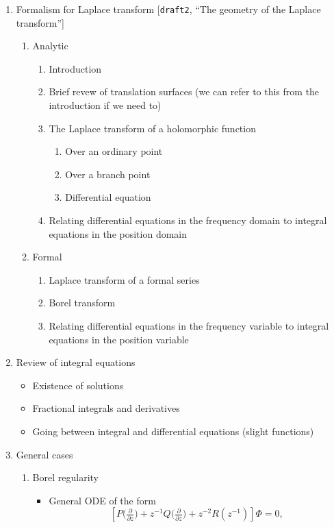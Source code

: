 \documentclass{article}
\begin{document}
\begin{enumerate}
\begin{itemize}
\begin{itemize}
\end{itemize}
\end{itemize}
\item Formalism for Laplace transform [{\tt draft2}, ``The geometry of the Laplace transform'']
\begin{enumerate}
\item Analytic
\begin{enumerate}
\item Introduction
\item Brief revew of translation surfaces (we can refer to this from the introduction if we need to)
\item The Laplace transform of a holomorphic function
\begin{enumerate}
\item Over an ordinary point
\item Over a branch point
\item Differential equation
\end{enumerate}
\item Relating differential equations in the frequency domain to integral equations in the position domain
\end{enumerate}
\item Formal
\begin{enumerate}
\item Laplace transform of a formal series
\item Borel transform
\item Relating differential equations in the frequency variable to integral equations in the position variable
\end{enumerate}
\end{enumerate}
\item Review of integral equations
\begin{itemize}
\item Existence of solutions
\item Fractional integrals and derivatives
\item Going between integral and differential equations (slight functions)
\end{itemize}
\item General cases
\begin{enumerate}
\item Borel regularity
\begin{itemize}
\item General ODE of the form
\[ \left[ P\big(\tfrac{\partial}{\partial z}\big) + z^{-1} Q\big(\tfrac{\partial}{\partial z}\big) + z^{-2} R(z^{-1}) \right] \Phi = 0, \]

\end{itemize}
\end{enumerate}
\end{enumerate}
\end{document}
